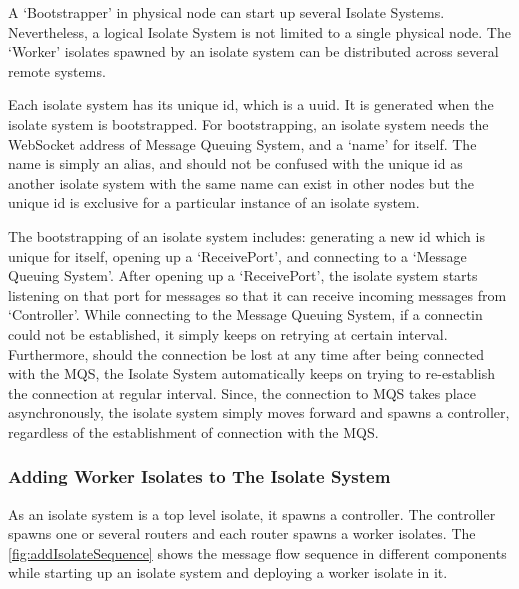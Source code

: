   A ‘Bootstrapper’ in physical node can start up several Isolate Systems. Nevertheless, a logical Isolate System is not limited to a single physical node. The ‘Worker’ isolates spawned by an isolate system can be distributed across several remote systems.

  Each isolate system has its unique id, which is a \acrshort{uuid}. It is generated when the isolate system is bootstrapped. For bootstrapping, an isolate system needs the WebSocket address of Message Queuing System, and a ‘name’ for itself. The name is simply an alias, and should not be confused with the unique id as another isolate system with the same name can exist in other nodes but the unique id is exclusive for a particular instance of an isolate system.

  The bootstrapping of an isolate system includes: generating a new id which is unique for itself, opening up a ‘ReceivePort’, and connecting to a ‘Message Queuing System’. After opening up a ‘ReceivePort’, the isolate system starts listening on that port for messages so that it can receive incoming messages from ‘Controller’. While connecting to the Message Queuing System, if a connectin could not be established, it simply keeps on retrying at certain interval. Furthermore, should the connection be lost at any time after being connected with the MQS, the Isolate System automatically keeps on trying to re-establish the connection at regular interval. Since, the connection to MQS takes place asynchronously, the isolate system simply moves forward and spawns a controller, regardless of the establishment of connection with the MQS.

  \subsubsection{Adding Worker Isolates to The Isolate System}
  As an isolate system is a top level isolate, it spawns a controller. The controller spawns one or several routers and each router spawns a worker isolates. The \autoref{fig:addIsolateSequence} shows the message flow sequence in different components while starting up an isolate system and deploying a worker isolate in it.

